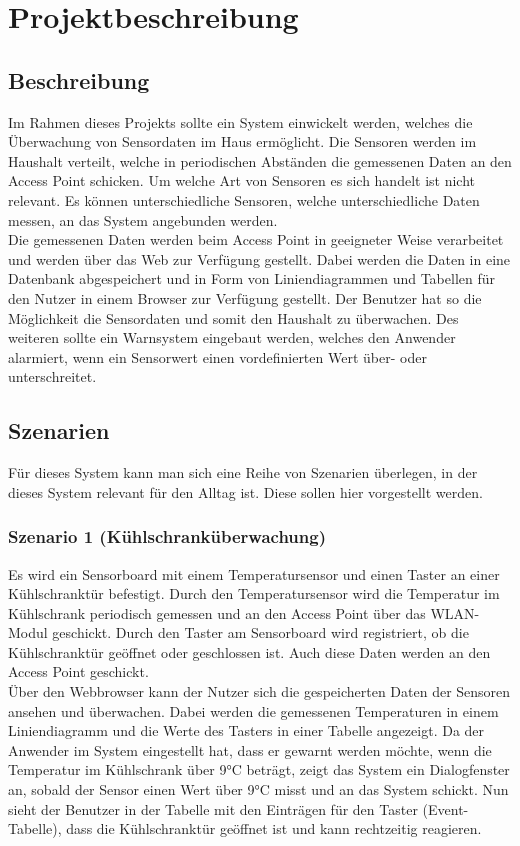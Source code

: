\documentclass[12pt,a4paper,twoside]{article}
\newcommand{\labelSec}[1]{\label{sec:#1}}
\begin{document}
\section{Projektbeschreibung}\labelSec{abschnitt}

\subsection{Beschreibung}

Im Rahmen dieses Projekts sollte ein System einwickelt werden, welches die Überwachung von Sensordaten im Haus ermöglicht. Die Sensoren werden im Haushalt verteilt, welche in periodischen Abständen die gemessenen Daten an den Access Point schicken. Um welche Art von Sensoren es sich handelt ist nicht relevant. Es können unterschiedliche Sensoren, welche unterschiedliche Daten messen, an das System angebunden werden.\\
Die gemessenen Daten werden beim Access Point in geeigneter Weise verarbeitet und werden über das Web zur Verfügung gestellt. Dabei werden die Daten in eine Datenbank abgespeichert und in Form von Liniendiagrammen und Tabellen für den Nutzer in einem Browser zur Verfügung gestellt. Der Benutzer hat so die Möglichkeit die Sensordaten und somit den Haushalt zu überwachen.
Des weiteren sollte ein Warnsystem eingebaut werden, welches den Anwender alarmiert, wenn ein Sensorwert einen vordefinierten Wert über- oder unterschreitet.

\subsection{Szenarien}
Für dieses System kann man sich eine Reihe von Szenarien überlegen, in der dieses System relevant für den Alltag ist. Diese sollen hier vorgestellt werden.

\subsubsection{Szenario 1 (Kühlschranküberwachung)}
Es wird ein Sensorboard mit einem Temperatursensor und einen Taster an einer Kühlschranktür befestigt. Durch den Temperatursensor wird die Temperatur im Kühlschrank periodisch gemessen und an den Access Point über das WLAN-Modul geschickt. Durch den Taster am Sensorboard wird registriert, ob die Kühlschranktür geöffnet oder geschlossen ist. Auch diese Daten werden an den Access Point geschickt. \\
Über den Webbrowser kann der Nutzer sich die gespeicherten Daten der Sensoren ansehen und überwachen. Dabei werden die gemessenen Temperaturen in einem Liniendiagramm und die Werte des Tasters in einer Tabelle angezeigt. Da der Anwender im System eingestellt hat, dass er gewarnt werden möchte, wenn die Temperatur im Kühlschrank über 9°C beträgt, zeigt das System ein Dialogfenster an, sobald der Sensor einen Wert über 9°C misst und an das System schickt. Nun sieht der Benutzer in der Tabelle mit den Einträgen für den Taster (Event-Tabelle), dass die Kühlschranktür geöffnet ist und kann rechtzeitig reagieren.
\end{document}
